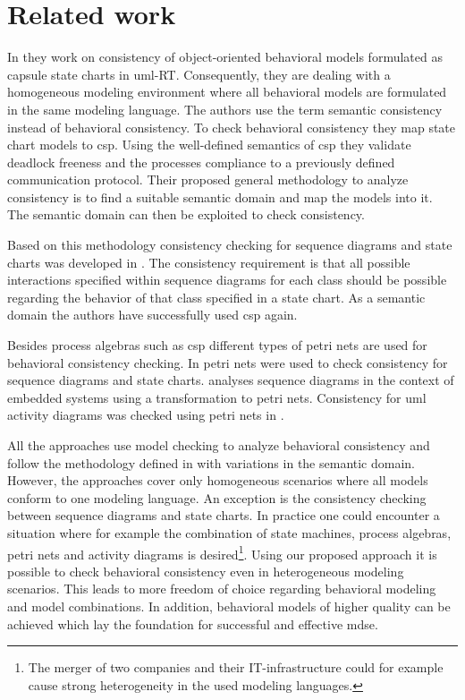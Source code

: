 \documentclass[conference]{IEEEtran}
\begin{document}
\section{Related work}
In \cite{engelsMethodologySpecifyingAnalyzing2001} they work on consistency of object-oriented behavioral models formulated as capsule state charts in \gls{uml}-RT.
Consequently, they are dealing with a homogeneous modeling environment where all behavioral models are formulated in the same modeling language.
The authors use the term semantic consistency instead of behavioral consistency.
To check behavioral consistency they map state chart models to \gls{csp}.
Using the well-defined semantics of \gls{csp} they validate deadlock freeness and the processes compliance to a previously defined communication protocol.
Their proposed general methodology to analyze consistency is to find a suitable semantic domain and map the models into it.
The semantic domain can then be exploited to check consistency.

Based on this methodology consistency checking for sequence diagrams and state charts was developed in \cite{kusterExplicitBehavioralConsistency2003}.
The consistency requirement is that all possible interactions specified within sequence diagrams for each class should be possible regarding the behavior of that class specified in a state chart.
As a semantic domain the authors have successfully used \gls{csp} again.

Besides process algebras such as \gls{csp} different types of petri nets are used for behavioral consistency checking.
In \cite{yaoConsistencyCheckingUML2006} petri nets were used to check consistency for sequence diagrams and state charts.
\cite{cunhaFormalVerificationUML2011} analyses sequence diagrams in the context of embedded systems using a transformation to petri nets.
Consistency for \gls{uml} activity diagrams was checked using petri nets in \cite{thierry-miegUMLBehavioralConsistency2008}.

All the approaches use model checking to analyze behavioral consistency and follow the methodology defined in \cite{engelsMethodologySpecifyingAnalyzing2001} with variations in the semantic domain.
However, the approaches cover only homogeneous scenarios where all models conform to one modeling language.
An exception is the consistency checking between sequence diagrams and state charts.
In practice one could encounter a situation where for example the combination of state machines, process algebras, petri nets and activity diagrams is desired\footnote{The merger of two companies and their IT-infrastructure could for example cause strong heterogeneity in the used modeling languages.}.
Using our proposed approach it is possible to check behavioral consistency even in heterogeneous modeling scenarios.
This leads to more freedom of choice regarding behavioral modeling and model combinations.
In addition, behavioral models of higher quality can be achieved which lay the foundation for successful and effective \gls{mdse}.
\end{document}
